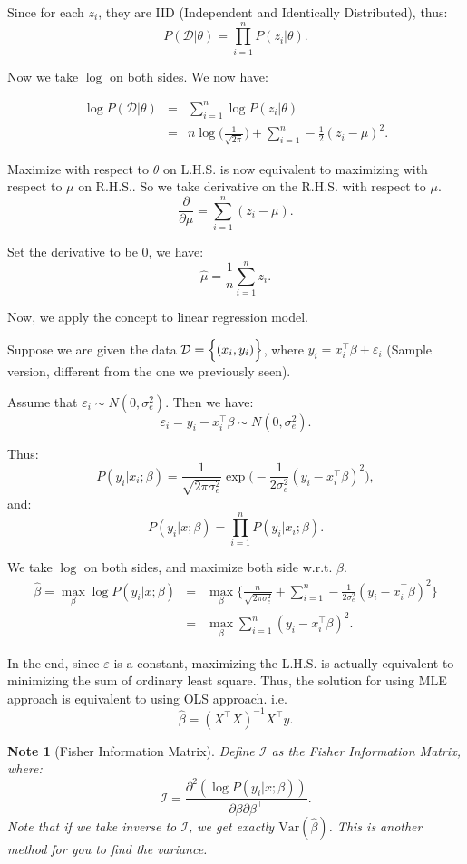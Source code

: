 \documentclass{article}
\theoremstyle{MyNonumberplain}
\theoremstyle{break}
\newcommand{\ve}{\varepsilon}
\newcommand{\var}{\text{Var}}
\newcommand{\T}{^\intercal}
\newcommand{\D}{\mathcal{D}}
\theoremstyle{break}
\newtheorem{note}{Note}
\theoremstyle{break}
\theoremstyle{break}
\begin{document}
Since for each $z_i$, they are IID (Independent and Identically Distributed), thus: 
$$P(\D|\theta)=\prod_{i=1}^n P(z_i|\theta).$$

Now we take $\log$ on both sides. We now have:

\begin{eqnarray*}
    \log P(\D|\theta)&=&\sum_{i=1}^n \log P(z_i|\theta)\\
                     &=&n\log\Biggl(\frac{1}{\sqrt{2\pi}}\Biggr) + \sum_{i=1}^n -\frac{1}{2}(z_i-\mu)^2.
\end{eqnarray*}

Maximize with respect to $\theta$ on L.H.S. is now equivalent to maximizing with respect to $\mu$ on R.H.S.. So we take derivative on the R.H.S. with respect to $\mu$.
$$\frac{\partial}{\partial\mu} =  \sum_{i=1}^n (z_i-\mu).$$

Set the derivative to be 0, we have:
$$\hat\mu=\frac{1}{n}\sum_{i=1}^n z_i.$$

Now, we apply the concept to linear regression model.

Suppose we are given the data $\D=\Bigl\{(x_i,y_i)\Bigr\}$, where $y_i=x_i\T\beta+\ve_i$ (Sample version, different from the one we previously seen).

Assume that $\ve_i\sim N(0,\sigma_e^2)$. Then we have:
$$\ve_i=y_i-x_i\T\beta\sim N(0,\sigma_e^2).$$

Thus:
$$P(y_i|x_i;\beta)=\frac{1}{\sqrt{2\pi\sigma_e^2}}\exp\Biggl(-\frac{1}{2\sigma_e^2}(y_i-x_i\T\beta)^2\Biggr),$$
and:
$$P(y_i|x;\beta)=\prod_{i=1}^{n}P(y_i|x_i;\beta).$$

We take $\log$ on both sides, and maximize both side w.r.t. $\beta$.
\begin{eqnarray*}
    \hat\beta=\max_\beta\log P(y_i|x;\beta)&=&\max_\beta\Biggl\{\frac{n}{\sqrt{2\pi\sigma_e^2}} + \sum_{i=1}^{n}-\frac{1}{2\sigma_e^2} (y_i-x_i\T\beta)^2\Biggr\}\\
    &=&\max_\beta\sum_{i=1}^{n} (y_i-x_i\T\beta)^2.
\end{eqnarray*}

In the end, since $\ve$ is a constant, maximizing the L.H.S. is actually equivalent to minimizing the sum of ordinary least square.
Thus, the solution for using MLE approach is equivalent to using OLS approach. i.e. $$\hat\beta=(X\T X)^{-1}X\T y.$$

\begin{notebox}
    \begin{note}[Fisher Information Matrix]
        Define $\mathcal{I}$ as the Fisher Information Matrix, where: $$\mathcal{I}=\frac{\partial^2 (\log P(y_i|x;\beta))}{\partial\beta\partial\beta\T}.$$
        Note that if we take inverse to $\mathcal{I}$, we get exactly $\var(\hat\beta)$. This is another method for you to find the variance.
    \end{note}
\end{notebox}
\end{document}
